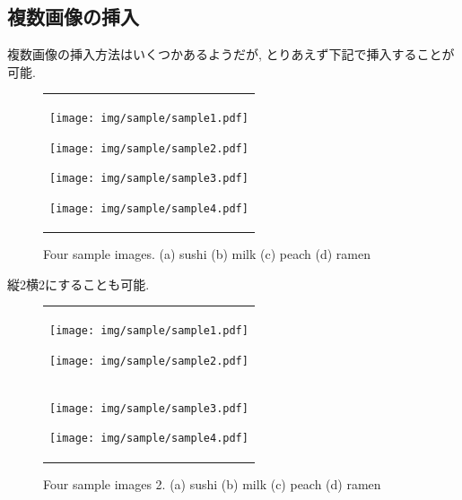     \subsection{複数画像の挿入}
    複数画像の挿入方法はいくつかあるようだが, とりあえず下記で挿入することが可能.
    \begin{figure}[htbp]
		\centering
		\begin{tabular}{c}
			\begin{minipage}{0.25\hsize}
				\centering
				\texttt{[image: img/sample/sample1.pdf]}
				\text{(a)}
			\end{minipage}
			\begin{minipage}{0.25\hsize}
				\centering
				\texttt{[image: img/sample/sample2.pdf]}
				\text{(b)}
			\end{minipage}
			\begin{minipage}{0.25\hsize}
				\centering
				\texttt{[image: img/sample/sample3.pdf]}
				\text{(c)}
			\end{minipage}
			\begin{minipage}{0.25\hsize}
				\centering
				\texttt{[image: img/sample/sample4.pdf]}
				\text{(d)}
			\end{minipage}
		\end{tabular}
		\caption[Four sample images]
		{
			Four sample images.
			(a) sushi (b) milk (c) peach (d) ramen
		}
		\label{fig:sample_four_images}
	\end{figure}

    縦2横2にすることも可能.
    \begin{figure}[H]
		\centering
		\begin{tabular}{c}
			\begin{minipage}{0.25\hsize}
				\centering
				\texttt{[image: img/sample/sample1.pdf]}
				\text{(a)}
			\end{minipage}
			\hspace{1cm}
			\begin{minipage}{0.25\hsize}
				\centering
				\texttt{[image: img/sample/sample2.pdf]}
				\text{(b)}
			\end{minipage}
			\vspace{1cm}\\
			\begin{minipage}{0.25\hsize}
				\centering
				\texttt{[image: img/sample/sample3.pdf]}
				\text{(c)}
			\end{minipage}
			\hspace{1cm}
			\begin{minipage}{0.25\hsize}
				\centering
				\texttt{[image: img/sample/sample4.pdf]}
				\text{(d)}
			\end{minipage}
		\end{tabular}
		\caption[Four sample images]
		{
			Four sample images 2.
			(a) sushi (b) milk (c) peach (d) ramen
		}
		\label{fig:sample_four_images2}
	\end{figure}
    
